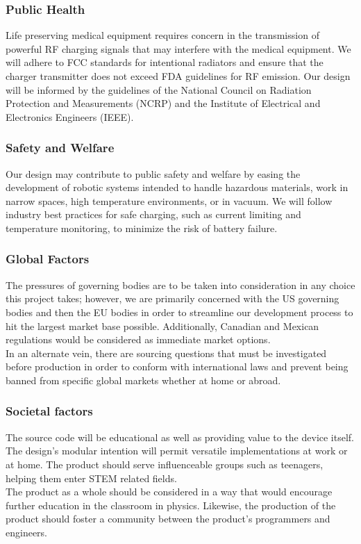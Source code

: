 \documentclass[12pt]{article}
\begin{document}
\subsubsection{Public Health}
Life preserving medical equipment requires concern in the transmission of powerful RF charging signals that may interfere with the medical equipment. We will adhere to FCC standards for intentional radiators and ensure that the charger transmitter does not exceed FDA guidelines for RF emission. Our design will be informed by the guidelines of the National Council on Radiation Protection and Measurements (NCRP) and the Institute of Electrical and Electronics Engineers (IEEE).
 
\subsubsection{Safety and Welfare}
Our design may contribute to public safety and welfare by easing the development of robotic systems intended to handle hazardous materials, work in narrow spaces, high temperature environments, or in vacuum. We will follow industry best practices for safe charging, such as current limiting and temperature monitoring, to minimize the risk of battery failure.

\pagebreak

\subsubsection{Global Factors}
The pressures of governing bodies are to be taken into consideration in any choice this project takes; however, we are primarily concerned with the US governing bodies and then the EU bodies in order to streamline our development process to hit the largest market base possible.  Additionally, Canadian and Mexican regulations would be considered as immediate market options.\\
In an alternate vein, there are sourcing questions that must be investigated before production in order to conform with international laws and prevent being banned from specific global markets whether at home or abroad.

\subsubsection{Societal factors}
The source code will be educational as well as providing value to the device itself.  The design's modular intention will permit versatile implementations at work or at home.  The product should serve influenceable groups such as teenagers, helping them enter STEM related fields.\\
The product as a whole should be considered in a way that would encourage further education in the classroom in physics.  Likewise, the production of the product should foster a community between the product's programmers and engineers.
\end{document}
